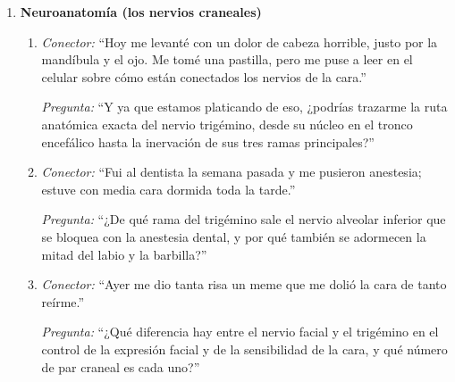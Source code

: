 \begin{enumerate}[label=\textbf{Tema \arabic*.}, wide=0pt, leftmargin=0pt, itemsep=0.6em]
  \item \textbf{Neuroanatomía (los nervios craneales)}
  \begin{enumerate}[label=\alph*), leftmargin=1.8em, itemsep=0.3em]
    \item \textit{Conector:} \enquote{Hoy me levanté con un dolor de cabeza horrible, justo por la mandíbula y el ojo. Me tomé una pastilla, pero me puse a leer en el celular sobre cómo están conectados los nervios de la cara.}\par
    \textit{Pregunta:} \enquote{Y ya que estamos platicando de eso, ¿podrías trazarme la ruta anatómica exacta del nervio trigémino, desde su núcleo en el tronco encefálico hasta la inervación de sus tres ramas principales?}
    \item \textit{Conector:} \enquote{Fui al dentista la semana pasada y me pusieron anestesia; estuve con media cara dormida toda la tarde.}\par
    \textit{Pregunta:} \enquote{¿De qué rama del trigémino sale el nervio alveolar inferior que se bloquea con la anestesia dental, y por qué también se adormecen la mitad del labio y la barbilla?}
    \item \textit{Conector:} \enquote{Ayer me dio tanta risa un meme que me dolió la cara de tanto reírme.}\par
    \textit{Pregunta:} \enquote{¿Qué diferencia hay entre el nervio facial y el trigémino en el control de la expresión facial y de la sensibilidad de la cara, y qué número de par craneal es cada uno?}
  \end{enumerate}


\end{enumerate}
